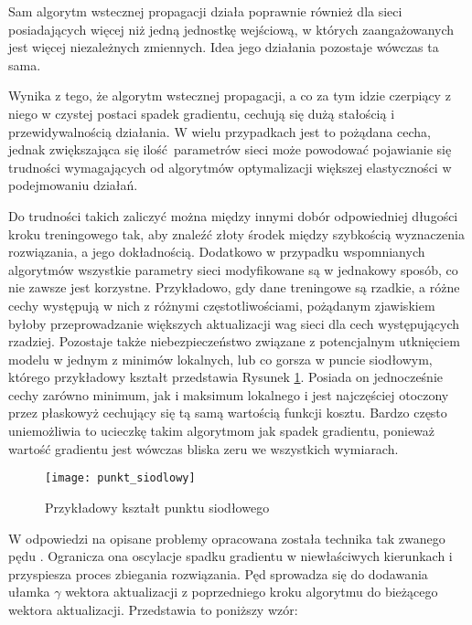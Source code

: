 \begin{enumerate}
    Sam algorytm wstecznej propagacji działa poprawnie również dla sieci posiadających
    więcej niż jedną jednostkę wejściową, w których zaangażowanych jest więcej
    niezależnych zmiennych. Idea jego działania pozostaje wówczas ta sama.

    Wynika z tego, że algorytm wstecznej propagacji, a co za tym idzie czerpiący z
    niego w czystej postaci spadek gradientu, cechują się dużą stałością i
    przewidywalnością działania. W wielu przypadkach jest to pożądana cecha, jednak
    zwiększająca się ilość parametrów sieci może powodować pojawianie się trudności
    wymagających od algorytmów optymalizacji większej elastyczności w podejmowaniu działań.

    Do trudności takich zaliczyć można między innymi dobór odpowiedniej długości
    kroku treningowego tak, aby znaleźć złoty środek między szybkością wyznaczenia
    rozwiązania, a jego dokładnością. Dodatkowo w przypadku wspomnianych algorytmów
    wszystkie parametry sieci modyfikowane są w jednakowy sposób, co nie zawsze jest
    korzystne. Przykładowo, gdy dane treningowe są rzadkie, a różne cechy występują
    w nich z różnymi częstotliwościami, pożądanym zjawiskiem byłoby przeprowadzanie większych
    aktualizacji wag sieci dla cech występujących rzadziej. Pozostaje także niebezpieczeństwo
    związane z potencjalnym utknięciem modelu w jednym z minimów lokalnych, lub co gorsza
    w puncie siodłowym, którego przykładowy kształt przedstawia Rysunek \ref{fig:punkt_siodlowy}.
    Posiada on jednocześnie cechy zarówno minimum, jak i maksimum lokalnego i jest najczęściej
    otoczony przez płaskowyż cechujący się tą samą wartością funkcji kosztu. Bardzo często
    uniemożliwia to ucieczkę takim algorytmom jak spadek gradientu, ponieważ wartość
    gradientu jest wówczas bliska zeru we wszystkich wymiarach.

    \begin{figure}[H]
      \centering
      \texttt{[image: punkt\_siodlowy]}
      \caption[Przykładowy kształt punktu siodłowego - źródło: \url{https://towardsdatascience.com/neural-network-optimization-7ca72d4db3e0}]{Przykładowy kształt punktu siodłowego}
      \label{fig:punkt_siodlowy}
    \end{figure}

    W odpowiedzi na opisane problemy opracowana została technika tak zwanego
    pędu \cite{Momentum}. Ogranicza ona oscylacje spadku gradientu w niewłaściwych kierunkach i
    przyspiesza proces zbiegania rozwiązania. Pęd sprowadza się do dodawania ułamka
    $\gamma$ wektora aktualizacji z poprzedniego kroku algorytmu do bieżącego wektora
    aktualizacji. Przedstawia to poniższy wzór:


\end{enumerate}
